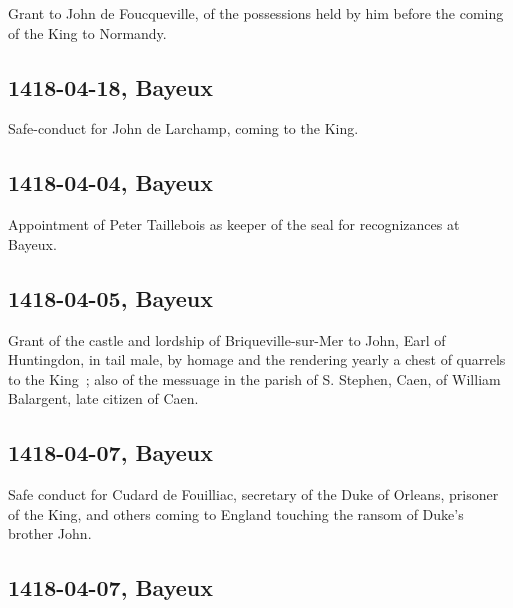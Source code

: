 \documentclass[a4paper,12pt,twoside]{book}
\begin{document}
                
                  Grant to John de Foucqueville, of the possessions held by him before the coming of the King to Normandy.
               
                
                \subsection{1418-04-18, Bayeux}
                
                
                  Safe-conduct for John de Larchamp, coming to the King.
               
                
                \subsection{1418-04-04, Bayeux}
                
                
                  Appointment of Peter Taillebois as keeper of the seal for recognizances at Bayeux.
               
                
                \subsection{1418-04-05, Bayeux}
                
                
                  Grant of the castle and lordship of Briqueville-sur-Mer to John, Earl of Huntingdon, in tail male, by homage and the rendering yearly a chest of quarrels to the King ; also of the messuage in the parish of S. Stephen, Caen, of William Balargent, late citizen of Caen.
               
                
                \subsection{1418-04-07, Bayeux}
                
                
                     Safe conduct for Cudard de Fouilliac, secretary of the Duke of Orleans, prisoner of the King, and others coming to England touching the ransom of Duke's brother John.
                  
                
                \subsection{1418-04-07, Bayeux}
                
\end{document}
